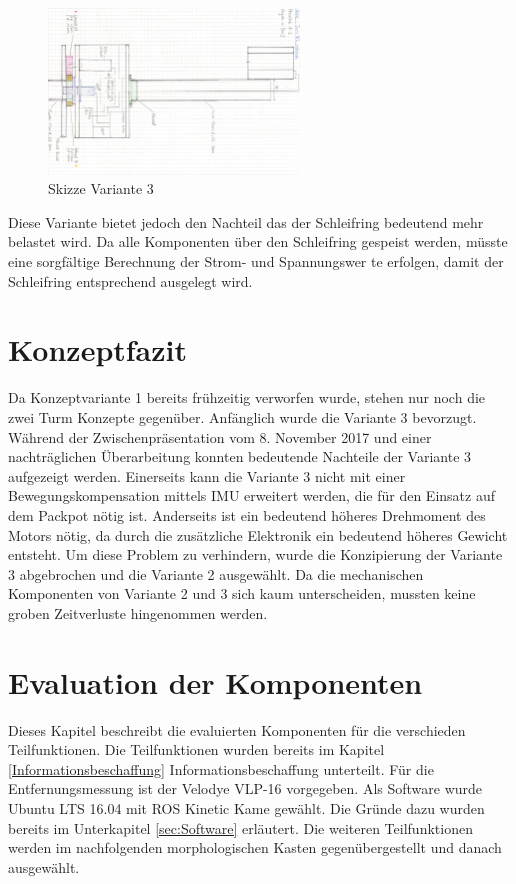 \begin{figure}[H]
	\centering
	\includegraphics[angle=90,width=0.6\textwidth]{resources/skizze_rotierend.PNG}
	\caption[Skizze Varainte 3]{Skizze Variante 3 }
	\label{fig:skizze_rotierend}
\end{figure} 

Diese Variante bietet jedoch den Nachteil das der Schleifring bedeutend mehr belastet wird. Da alle Komponenten über den Schleifring gespeist werden, müsste eine sorgfältige Berechnung der Strom- und Spannungswer te erfolgen, damit der Schleifring entsprechend ausgelegt wird.

 \section {Konzeptfazit}
 \label{sec:Konzeptfazit}
 Da Konzeptvariante 1 bereits frühzeitig verworfen wurde, stehen nur noch die zwei Turm Konzepte gegenüber. Anfänglich wurde die Variante 3 bevorzugt. Während der Zwischenpräsentation vom 8. November 2017 und einer nachträglichen Überarbeitung konnten bedeutende Nachteile der Variante 3 aufgezeigt werden. Einerseits kann die Variante 3 nicht mit einer Bewegungskompensation mittels \ac{IMU} erweitert werden, die für den Einsatz auf dem Packpot nötig ist. Anderseits ist ein bedeutend höheres Drehmoment des Motors nötig, da durch die zusätzliche Elektronik ein bedeutend höheres Gewicht entsteht. Um diese Problem zu verhindern, wurde die Konzipierung der Variante 3 abgebrochen und die Variante 2 ausgewählt. Da die mechanischen Komponenten von Variante 2 und 3 sich kaum unterscheiden, mussten keine groben Zeitverluste hingenommen werden.
 
\section {Evaluation der Komponenten}
\label{sec:ausgewählteKomponenten}
Dieses Kapitel beschreibt die evaluierten Komponenten für die verschieden Teilfunktionen. Die Teilfunktionen wurden bereits im  Kapitel \ref{Informationsbeschaffung} Informationsbeschaffung unterteilt. Für die Entfernungsmessung ist der Velodye VLP-16 vorgegeben. Als Software wurde Ubuntu LTS 16.04 mit ROS Kinetic Kame gewählt. Die Gründe dazu wurden bereits im Unterkapitel \ref{sec:Software} erläutert. Die weiteren Teilfunktionen werden im nachfolgenden morphologischen Kasten gegenübergestellt und danach ausgewählt.

